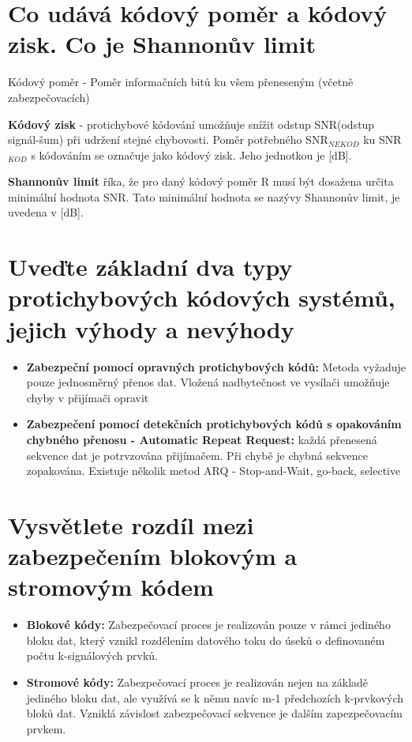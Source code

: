 \section{Co udává kódový poměr a kódový zisk. Co je Shannonův limit}
Kódový poměr - Poměr informačních bitů ku všem přeneseným (včetně zabezpečovacích)

\textbf{Kódový zisk} - protichybové kódování umožňuje snížit odstup SNR(odstup signál-šum) při udržení stejné chybovosti.
Poměr potřebného SNR$_{NEKOD}$ ku SNR$_{KOD}$ s kódováním se označuje jako kódový zisk. 
Jeho jednotkou je [dB].

\textbf{Shannonův limit} říka, že pro daný kódový poměr R musí být dosažena určita minimální hodnota SNR.
Tato minimální hodnota se nazývy Shannonův limit, je uvedena v [dB].

\section{Uveďte základní dva typy protichybových kódových systémů, jejich výhody a nevýhody}
\begin{itemize}
    \item \textbf{Zabezpeční pomocí opravných protichybových kódů:} Metoda vyžaduje pouze jednosměrný přenos dat.
    Vložená nadbytečnost ve vysílači umožňuje chyby v přijímači opravit
    \item \textbf{Zabezpečení pomocí detekčních protichybových kódů s opakováním chybného přenosu - Automatic Repeat Request: }každá přenesená sekvence dat je potrvzována přijímačem.
    Při chybě je chybná sekvence zopakována.
    Existuje několik metod ARQ - Stop-and-Wait, go-back, selective
\end{itemize}
\section{Vysvětlete rozdíl mezi zabezpečením blokovým a stromovým kódem}
\begin{itemize}
    \item \textbf{Blokové kódy:} Zabezpečovací proces je realizován pouze v rámci jediného bloku dat, který vznikl rozdělením datového toku do úseků o definovaném počtu k-signálových prvků.
    \item \textbf{Stromové kódy: }Zabezpečovací proces je realizován nejen na základě jediného bloku dat, ale využívá se k němu navíc m-1 předchozích k-prvkových bloků dat.
    Vzniklá závislost zabezpečovací sekvence je dalším zapezpečovacím prvkem.
\end{itemize}

